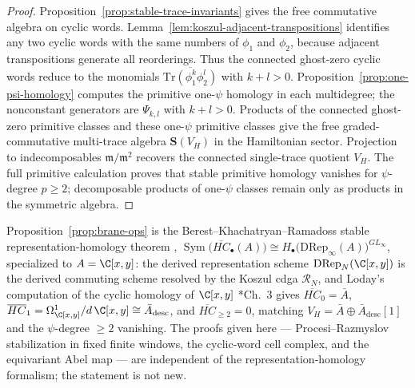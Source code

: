 \documentclass[11pt]{memoir}
\begin{document}
\begin{proof}
  Proposition~\ref{prop:stable-trace-invariants} gives the free commutative
  algebra on cyclic words.
  Lemma~\ref{lem:koszul-adjacent-transpositions} identifies any two cyclic words with the same
  numbers of $\phi_1$ and $\phi_2$, because adjacent transpositions generate
  all reorderings. Thus the connected ghost-zero cyclic words reduce to the
  monomials \(\overline{\mathrm{Tr}(\phi_1^k\phi_2^l)}\) with \(k+l>0\).
	  Proposition~\ref{prop:one-psi-homology} computes the primitive one-$\psi$
	  homology in each multidegree; the nonconstant generators are $\Psi_{k,l}$ with
	  $k+l>0$. Products of the connected ghost-zero primitive classes and these
	  one-$\psi$ primitive classes give the free graded-commutative multi-trace
	  algebra \(\mathbf S(V_H)\) in the Hamiltonian sector.  Projection to
	  indecomposables \(\mathfrak m/\mathfrak m^2\) recovers the connected
	  single-trace quotient \(V_H\).  The full primitive calculation proves
  that stable primitive homology vanishes for \(\psi\)-degree \(p\ge2\);
  decomposable products of one-\(\psi\) classes remain only as products in
  the symmetric algebra.
\end{proof}

\begin{rmk}
\label{rmk:brane-ops-bkr-loday}
  Proposition~\ref{prop:brane-ops} is the
  Berest--Khachatryan--Ramadoss stable representation-homology theorem
  \cite{berest-khachatryan-ramadoss},
  \(\operatorname{Sym}\bigl(\overline{HC}_\bullet(A)\bigr)\cong
   H_\bullet\bigl(\mathrm{DRep}_\infty(A)\bigr)^{GL_\infty}\),
  specialized to \(A=\C[x,y]\): the derived representation scheme
  \(\mathrm{DRep}_N(\C[x,y])\) is the derived commuting scheme resolved
  by the Koszul cdga \(\mathcal R_N\), and Loday's computation of the
  cyclic homology of \(\C[x,y]\) \cite{loday-cyclic-homology}*{Ch.~3}
  gives
  \(\overline{HC}_0=\bar A\),
  \(\overline{HC}_1=\Omega^1_{\C[x,y]}/d\,\C[x,y]\cong
    \bar A_{\mathrm{desc}}\), and
  \(\overline{HC}_{\geq2}=0\), matching \(V_H=\bar A\oplus\bar
  A_{\mathrm{desc}}[1]\) and the \(\psi\)-degree \(\geq2\) vanishing.
  The proofs given here --- Procesi--Razmyslov stabilization in fixed
  finite windows, the cyclic-word cell complex, and the equivariant
  Abel map --- are independent of the representation-homology
  formalism; the statement is not new.
\end{rmk}
\end{document}
